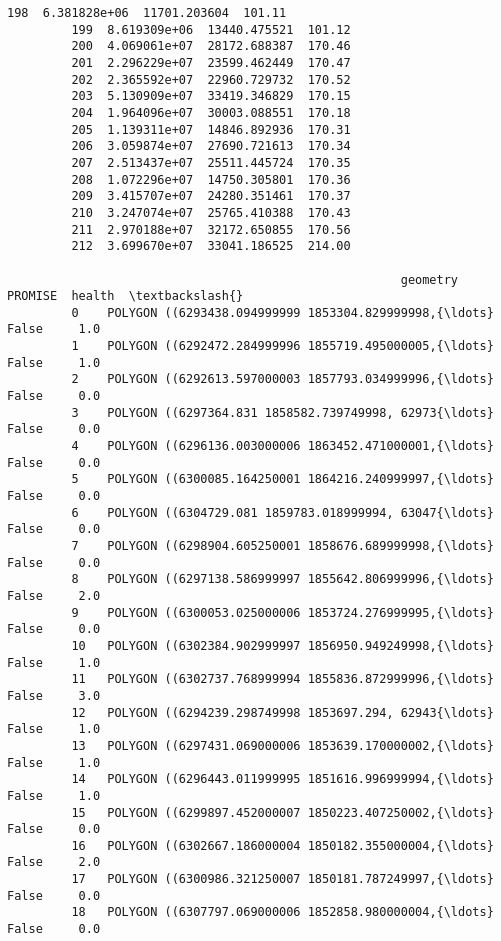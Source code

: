 \documentclass[11pt]{article}
\begin{document}
\begin{Verbatim}[commandchars=\\\{\}]
         198  6.381828e+06  11701.203604  101.11   
         199  8.619309e+06  13440.475521  101.12   
         200  4.069061e+07  28172.688387  170.46   
         201  2.296229e+07  23599.462449  170.47   
         202  2.365592e+07  22960.729732  170.52   
         203  5.130909e+07  33419.346829  170.15   
         204  1.964096e+07  30003.088551  170.18   
         205  1.139311e+07  14846.892936  170.31   
         206  3.059874e+07  27690.721613  170.34   
         207  2.513437e+07  25511.445724  170.35   
         208  1.072296e+07  14750.305801  170.36   
         209  3.415707e+07  24280.351461  170.37   
         210  3.247074e+07  25765.410388  170.43   
         211  2.970188e+07  32172.650855  170.56   
         212  3.699670e+07  33041.186525  214.00   
         
                                                       geometry  PROMISE  health  \textbackslash{}
         0    POLYGON ((6293438.094999999 1853304.829999998,{\ldots}    False     1.0   
         1    POLYGON ((6292472.284999996 1855719.495000005,{\ldots}    False     1.0   
         2    POLYGON ((6292613.597000003 1857793.034999996,{\ldots}    False     0.0   
         3    POLYGON ((6297364.831 1858582.739749998, 62973{\ldots}    False     0.0   
         4    POLYGON ((6296136.003000006 1863452.471000001,{\ldots}    False     0.0   
         5    POLYGON ((6300085.164250001 1864216.240999997,{\ldots}    False     0.0   
         6    POLYGON ((6304729.081 1859783.018999994, 63047{\ldots}    False     0.0   
         7    POLYGON ((6298904.605250001 1858676.689999998,{\ldots}    False     0.0   
         8    POLYGON ((6297138.586999997 1855642.806999996,{\ldots}    False     2.0   
         9    POLYGON ((6300053.025000006 1853724.276999995,{\ldots}    False     0.0   
         10   POLYGON ((6302384.902999997 1856950.949249998,{\ldots}    False     1.0   
         11   POLYGON ((6302737.768999994 1855836.872999996,{\ldots}    False     3.0   
         12   POLYGON ((6294239.298749998 1853697.294, 62943{\ldots}    False     1.0   
         13   POLYGON ((6297431.069000006 1853639.170000002,{\ldots}    False     1.0   
         14   POLYGON ((6296443.011999995 1851616.996999994,{\ldots}    False     1.0   
         15   POLYGON ((6299897.452000007 1850223.407250002,{\ldots}    False     0.0   
         16   POLYGON ((6302667.186000004 1850182.355000004,{\ldots}    False     2.0   
         17   POLYGON ((6300986.321250007 1850181.787249997,{\ldots}    False     0.0   
         18   POLYGON ((6307797.069000006 1852858.980000004,{\ldots}    False     0.0   

\end{Verbatim}
\end{document}

